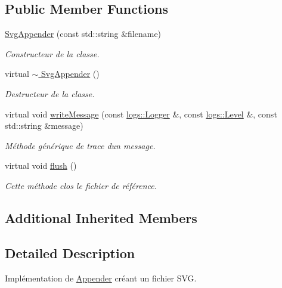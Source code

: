 \subsection*{Public Member Functions}
\begin{DoxyCompactItemize}
\item 
\mbox{\label{classlogs_1_1SvgAppender_a98b279145533d5f20bb95bbeb9420218}} 
\hyperlink{classlogs_1_1SvgAppender_a98b279145533d5f20bb95bbeb9420218}{Svg\+Appender} (const std\+::string \&filename)
\begin{DoxyCompactList}\small\item\em Constructeur de la classe. \end{DoxyCompactList}\item 
\mbox{\label{classlogs_1_1SvgAppender_a9ff14acb675c6e171f5dd3cc922d2911}} 
virtual \hyperlink{classlogs_1_1SvgAppender_a9ff14acb675c6e171f5dd3cc922d2911}{$\sim$ Svg\+Appender} ()
\begin{DoxyCompactList}\small\item\em Destructeur de la classe. \end{DoxyCompactList}\item 
virtual void \hyperlink{classlogs_1_1SvgAppender_a9ec86931329330e976a213510d4d82e6}{write\+Message} (const \hyperlink{classlogs_1_1Logger}{logs\+::\+Logger} \&, const \hyperlink{classlogs_1_1Level}{logs\+::\+Level} \&, const std\+::string \&message)
\begin{DoxyCompactList}\small\item\em Méthode générique de trace d\textquotesingle{}un message. \end{DoxyCompactList}\item 
virtual void \hyperlink{classlogs_1_1SvgAppender_a2ad23bf7a9d95d09684c0f352e3cea1a}{flush} ()
\begin{DoxyCompactList}\small\item\em Cette méthode clos le fichier de référence. \end{DoxyCompactList}\end{DoxyCompactItemize}
\subsection*{Additional Inherited Members}


\subsection{Detailed Description}
Implémentation de \hyperlink{classlogs_1_1Appender}{Appender} créant un fichier S\+VG. 

